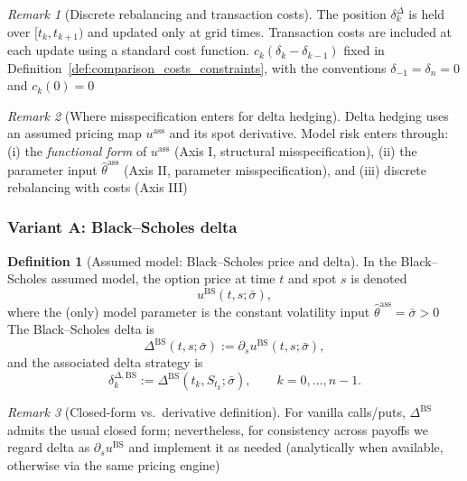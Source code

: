 \documentclass[12pt,a4paper]{article}
\theoremstyle{definition}
\newtheorem{definition}{Definition}[section]
\theoremstyle{plain}
\theoremstyle{remark}
\newtheorem{remark}{Remark}[section]
\theoremstyle{plain}
\begin{document}
\begin{remark}[Discrete rebalancing and transaction costs]
\label{rem:delta_discrete_rebalancing_costs}
The position $\delta_k^\Delta$ is held over $[t_k,t_{k+1})$ and updated only at grid times.
Transaction costs are included at each update using a standard cost function.
$c_k(\delta_k-\delta_{k-1})$ fixed in Definition~\ref{def:comparison_costs_constraints},
with the conventions $\delta_{-1}=\delta_n=0$ and $c_k(0)=0$ \cite{Buehler2019DeepHedging}
\end{remark}

\begin{remark}[Where misspecification enters for delta hedging]
\label{rem:where_misspec_enters_delta}
Delta hedging uses an assumed pricing map $u^{\mathrm{ass}}$ and its spot derivative.
Model risk enters through:
(i) the \emph{functional form} of $u^{\mathrm{ass}}$ (Axis I, structural misspecification),
(ii) the parameter input $\hat\theta^{\mathrm{ass}}$ (Axis II, parameter misspecification),
and (iii) discrete rebalancing with costs (Axis III) \cite{ElKaroui1998Robustness,BlackScholes1973,Heston1993,Buehler2019DeepHedging}
\end{remark}

\subsubsection{Variant A: Black--Scholes delta}
\label{subsubsec:bs_delta}

\begin{definition}[Assumed model: Black--Scholes price and delta]
\label{def:bs_price_delta}
In the Black--Scholes assumed model, the option price at time $t$ and spot $s$ is denoted
\[
u^{\mathrm{BS}}(t,s;\bar\sigma),
\]
where the (only) model parameter is the constant volatility input $\hat\theta^{\mathrm{ass}}=\bar\sigma>0$ \cite{BlackScholes1973}
The Black--Scholes delta is
\[
\Delta^{\mathrm{BS}}(t,s;\bar\sigma) := \partial_s u^{\mathrm{BS}}(t,s;\bar\sigma),
\]
and the associated delta strategy is
\[
\delta^{\Delta,\mathrm{BS}}_k := \Delta^{\mathrm{BS}}(t_k,S_{t_k};\bar\sigma), \qquad k=0,\dots,n-1.
\]
\end{definition}

\begin{remark}[Closed-form vs.\ derivative definition]
\label{rem:bs_closed_form}
For vanilla calls/puts, $\Delta^{\mathrm{BS}}$ admits the usual closed form;
nevertheless, for consistency across payoffs we regard delta as $\partial_s u^{\mathrm{BS}}$
and implement it as needed (analytically when available, otherwise via the same pricing engine) \cite{BlackScholes1973}
\end{remark}
\end{document}
